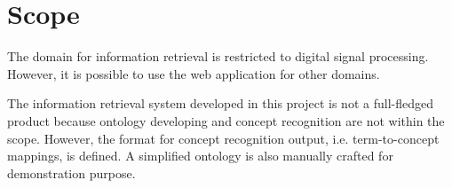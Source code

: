 \section{Scope}
The domain for information retrieval is restricted to digital signal processing. However, it is possible to use the web application for other domains. 

The information retrieval system developed in this project is not a full-fledged product because ontology developing and concept recognition are not within the scope. However, the format for concept recognition output, i.e. term-to-concept mappings, is defined. A simplified ontology is also manually crafted for demonstration purpose.